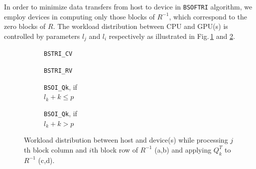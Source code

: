 \documentclass{llncs}
\newcommand{\Bsoftri}{\texttt{BSOFTRI}\xspace}
\begin{document}
    In order to minimize data transfers from host to device 
    in \Bsoftri algorithm,
    we employ devices in computing only those blocks of $R^{-1}$,
    which correspond to the zero blocks of $R$. 
    The workload distribution between CPU and GPU(s) is 
    controlled by parameters $l_j$ and $l_i$ respectively
    as illustrated in Fig.\,\ref{fig:BSTRI_CV_HostDevice_workload} and \ref{fig:BSTRI_RV_HostDevice_workload}.

    \begin{figure}[t]
      \centering
      \begin{subfigure}[t]{0.2\linewidth}
        \scalebox{0.59}{}
        \caption{{\tt BSTRI\_CV} \label{fig:BSTRI_CV_HostDevice_workload}}
      \end{subfigure}
      \begin{subfigure}[t]{0.4\linewidth}
        \scalebox{0.59}{}
        \caption{{\tt BSTRI\_RV}\label{fig:BSTRI_RV_HostDevice_workload}}
      \end{subfigure}
      \begin{subfigure}[t]{0.17\linewidth}
        \scalebox{0.59}{}
        \caption{{\tt BSOI\_Qk}, if \\$l_k + k \leq p$ \label{fig:BSOI_Qk_HostDevice_workload1}}
      \end{subfigure}
      \begin{subfigure}[t]{0.17\linewidth}
        \scalebox{0.59}{}
        \caption{{\tt BSOI\_Qk}, if \\$l_k + k > p$ \label{fig:BSOI_Qk_HostDevice_workload2}}
      \end{subfigure}

      \caption[]{Workload distribution between host and device(s) 
        while processing 
        $j$th block column and $i$th block row of $R^{-1}$ (a,b) 
        and applying $Q_k^T$ to $R^{-1}$ (c,d).\footnotemark}
      \label{fig:HostDevice_workload}
    \end{figure}
\end{document}
